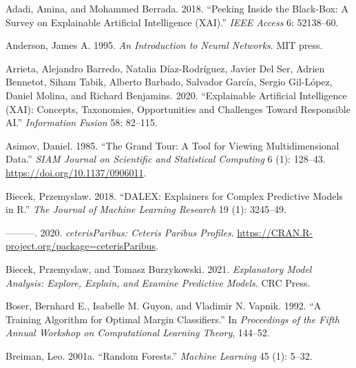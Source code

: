 \documentclass[11pt,twoside]{article}
\newlength{\cslhangindent}
\newlength{\cslentryspacingunit} %
\newenvironment{CSLReferences}[2] %
 {%
  \setlength{\parindent}{0pt}
  \ifodd #1
  \let\oldpar\par
  \def\par{\hangindent=\cslhangindent\oldpar}
  \fi
  \setlength{\parskip}{#2\cslentryspacingunit}
 }%
 {}
\begin{document}
\hypertarget{refs}{}
\begin{CSLReferences}{1}{0}
\leavevmode{}%
Adadi, Amina, and Mohammed Berrada. 2018. {``Peeking Inside the Black-Box: A Survey on Explainable Artificial Intelligence ({XAI}).''} \emph{IEEE Access} 6: 52138--60.

\leavevmode{}%
Anderson, James A. 1995. \emph{An Introduction to Neural Networks}. MIT press.

\leavevmode{}%
Arrieta, Alejandro Barredo, Natalia Díaz-Rodríguez, Javier Del Ser, Adrien Bennetot, Siham Tabik, Alberto Barbado, Salvador García, Sergio Gil-López, Daniel Molina, and Richard Benjamins. 2020. {``Explainable {Artificial} {Intelligence} ({XAI}): {Concepts}, Taxonomies, Opportunities and Challenges Toward Responsible {AI}.''} \emph{Information Fusion} 58: 82--115.

\leavevmode{}%
Asimov, Daniel. 1985. {``The {Grand} {Tour}: A {Tool} for {Viewing} {Multidimensional} {Data}.''} \emph{SIAM Journal on Scientific and Statistical Computing} 6 (1): 128--43. \url{https://doi.org/10.1137/0906011}.

\leavevmode{}%
Biecek, Przemyslaw. 2018. {``{DALEX}: Explainers for Complex Predictive Models in {R}.''} \emph{The Journal of Machine Learning Research} 19 (1): 3245--49.

\leavevmode{}%
---------. 2020. \emph{{ceterisParibus}: {Ceteris} {Paribus} {Profiles}}. \url{https://CRAN.R-project.org/package=ceterisParibus}.

\leavevmode{}%
Biecek, Przemyslaw, and Tomasz Burzykowski. 2021. \emph{Explanatory {Model} {Analysis}: {Explore}, {Explain}, and {Examine} {Predictive} {Models}}. CRC Press.

\leavevmode{}%
Boser, Bernhard E., Isabelle M. Guyon, and Vladimir N. Vapnik. 1992. {``A Training Algorithm for Optimal Margin Classifiers.''} In \emph{Proceedings of the Fifth Annual Workshop on {Computational} Learning Theory}, 144--52.

\leavevmode{}%
Breiman, Leo. 2001a. {``Random Forests.''} \emph{Machine Learning} 45 (1): 5--32.


\end{CSLReferences}
\end{document}
